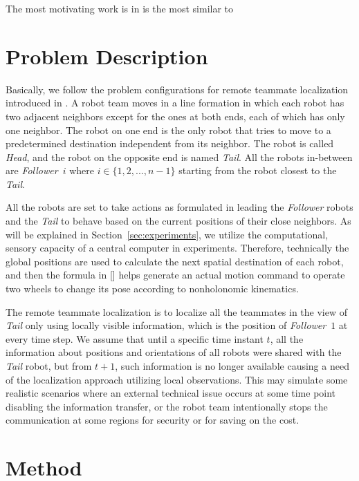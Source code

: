 \documentclass[letterpaper, 10 pt, conference]{ieeeconf}  %
\begin{document}
	The most motivating work is in \cite{CPR17} is the most similar to 
	
	\section{Problem Description} 
	\label{sec:problem_description}
	
	Basically, we follow the problem configurations for remote teammate localization introduced in 
	\cite{CPR17}. A robot team moves in a line formation in which	each robot has 
	two adjacent neighbors except for the ones at both ends, each of which has only one neighbor. 
	The robot on one end is the only robot that tries to move to a 
	predetermined destination independent from its neighbor. The robot is called 
	\emph{Head}, and the robot on the opposite end is named \emph{Tail}. 
	All the robots in-between are \emph{Follower}~$i$ where $i \in \{1, 2, ..., n-1\}$ starting
	from the robot closest to the \emph{Tail}.
	
	All the robots are set to take actions as formulated in \cite{CPR17} leading  
	the \emph{Follower} robots and the \emph{Tail} to behave based on the 
	current positions of their close neighbors. As will be explained in 
	Section~\ref{sec:experiments}, we utilize the computational, sensory capacity of a central 
	computer in experiments. Therefore, technically the global positions are used to calculate the next 
	spatial destination of each robot, and then the formula in [] helps generate an actual motion 
	command to operate two wheels to change its pose according to nonholonomic kinematics. 
	
	The remote teammate localization is to localize all the teammates in the view of 
	\emph{Tail} only using locally visible information, which is the position of 
	\emph{Follower}~$1$ at every time step. We assume that until a specific time instant 
	$t$, all the information about positions and orientations of all robots 
	were shared with the \emph{Tail} robot, but from $t+1$, such information is no longer 
	available causing a need of the localization approach utilizing local observations.	
	This may simulate some realistic scenarios where 
	an external technical issue occurs at some time point disabling the information 
	transfer, or the robot team intentionally stops the communication at some regions for security 
	or for saving on the cost.
	 
	
	\section{Method}
	\label{sec:method}
	
\end{document}
